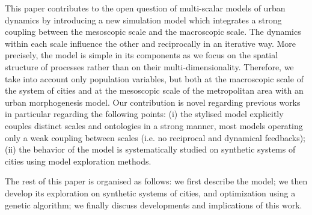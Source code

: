 \documentclass[11pt]{article}
\begin{document}
This paper contributes to the open question of multi-scalar models of urban dynamics by introducing a new simulation model which integrates a strong coupling between the mesoscopic scale and the macroscopic scale. The dynamics within each scale influence the other and reciprocally in an iterative way. More precisely, the model is simple in its components as we focus on the spatial structure of processes rather than on their multi-dimensionality. Therefore, we take into account only population variables, but both at the macroscopic scale of the system of cities and at the mesoscopic scale of the metropolitan area with an urban morphogenesis model. Our contribution is novel regarding previous works in particular regarding the following points: (i) the stylised model explicitly couples distinct scales and ontologies in a strong manner, most models operating only a weak coupling between scales (i.e. no reciprocal and dynamical feedbacks); (ii) the behavior of the model is systematically studied on synthetic systems of cities using model exploration methods.
 
 
The rest of this paper is organised as follows: we first describe the model; we then develop its exploration on synthetic systems of cities, and optimization using a genetic algorithm; we finally discuss developments and implications of this work.


\end{document}
